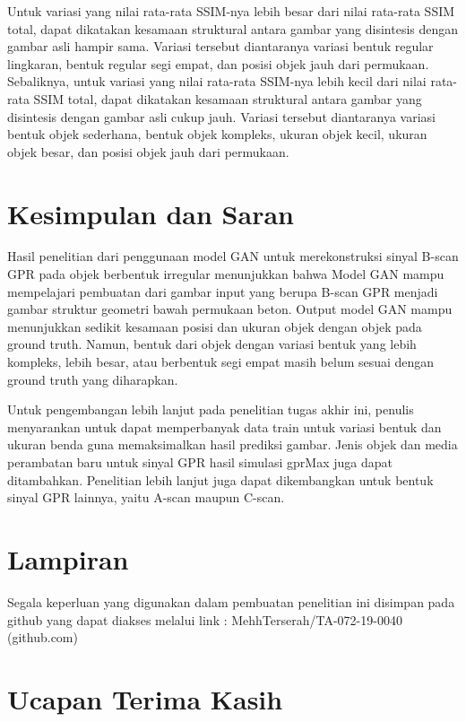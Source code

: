 \documentclass[conference]{IEEEtran}
\begin{document}
Untuk variasi yang nilai rata-rata SSIM-nya lebih besar dari nilai rata-rata SSIM total, dapat dikatakan kesamaan struktural antara gambar yang disintesis dengan gambar asli hampir sama. 
Variasi tersebut diantaranya variasi bentuk regular lingkaran, bentuk regular segi empat, dan posisi objek jauh dari permukaan. 
Sebaliknya, untuk variasi yang nilai rata-rata SSIM-nya lebih kecil dari nilai rata-rata SSIM total, dapat dikatakan kesamaan struktural antara gambar yang disintesis dengan gambar asli cukup jauh. 
Variasi tersebut diantaranya variasi bentuk objek sederhana, bentuk objek kompleks, ukuran objek kecil, ukuran objek besar, dan posisi objek jauh dari permukaan.

\section{Kesimpulan dan Saran}

Hasil penelitian dari penggunaan model GAN untuk merekonstruksi sinyal B-scan GPR pada objek berbentuk irregular menunjukkan bahwa Model GAN mampu mempelajari pembuatan dari gambar input yang berupa B-scan GPR menjadi gambar struktur geometri bawah permukaan beton. 
Output model GAN mampu menunjukkan sedikit kesamaan posisi dan ukuran objek dengan objek pada ground truth.
Namun, bentuk dari objek dengan variasi bentuk yang lebih kompleks, lebih besar, atau berbentuk segi empat masih belum sesuai dengan ground truth yang diharapkan.

Untuk pengembangan lebih lanjut pada penelitian tugas akhir ini, penulis menyarankan untuk dapat memperbanyak data train untuk variasi bentuk dan ukuran benda guna memaksimalkan hasil prediksi gambar.
Jenis objek dan media perambatan baru untuk sinyal GPR hasil simulasi gprMax juga dapat ditambahkan. Penelitian lebih lanjut juga dapat dikembangkan untuk bentuk sinyal GPR lainnya, yaitu A-scan maupun C-scan.

\section{Lampiran}

Segala keperluan yang digunakan dalam pembuatan penelitian ini disimpan pada github yang dapat diakses melalui link : MehhTerserah/TA-072-19-0040 (github.com)

\section{Ucapan Terima Kasih}
\end{document}
